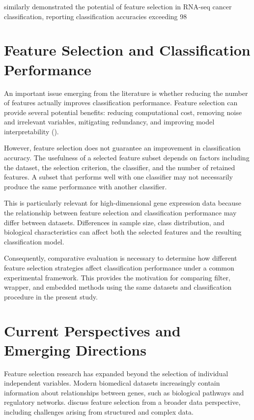 \citet{garcia-diaz_unsupervised_2020} similarly demonstrated the potential of feature selection in RNA-seq cancer classification, reporting classification accuracies exceeding 98%

\section{Feature Selection and Classification Performance}

An important issue emerging from the literature is whether reducing the number of features actually improves classification performance. Feature selection can provide several potential benefits: reducing computational cost, removing noise and irrelevant variables, mitigating redundancy, and improving model interpretability (\cite{li2017feature,venkatesh2019review}).

However, feature selection does not guarantee an improvement in classification accuracy. The usefulness of a selected feature subset depends on factors including the dataset, the selection criterion, the classifier, and the number of retained features. A subset that performs well with one classifier may not necessarily produce the same performance with another classifier.

This is particularly relevant for high-dimensional gene expression data because the relationship between feature selection and classification performance may differ between datasets. Differences in sample size, class distribution, and biological characteristics can affect both the selected features and the resulting classification model.

Consequently, comparative evaluation is necessary to determine how different feature selection strategies affect classification performance under a common experimental framework. This provides the motivation for comparing filter, wrapper, and embedded methods using the same datasets and classification procedure in the present study.

\section{Current Perspectives and Emerging Directions}

Feature selection research has expanded beyond the selection of individual independent variables. Modern biomedical datasets increasingly contain information about relationships between genes, such as biological pathways and regulatory networks. \citet{li2017feature} discuss feature selection from a broader data perspective, including challenges arising from structured and complex data.

